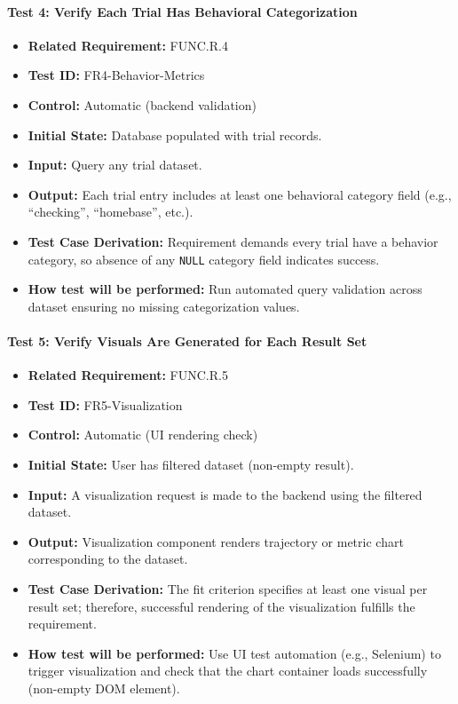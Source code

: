 \documentclass[12pt, titlepage]{article}
\begin{document}
\paragraph{Test 4: Verify Each Trial Has Behavioral Categorization}
\begin{itemize}
    \item \textbf{Related Requirement:} FUNC.R.4
    \item \textbf{Test ID:} FR4-Behavior-Metrics
    \item \textbf{Control:} Automatic (backend validation)
    \item \textbf{Initial State:} Database populated with trial records.
    \item \textbf{Input:} Query any trial dataset.
    \item \textbf{Output:} Each trial entry includes at least one behavioral category field (e.g., ``checking'', ``homebase'', etc.).
    \item \textbf{Test Case Derivation:} Requirement demands every trial have a behavior category, so absence of any \texttt{NULL} category field indicates success.
    \item \textbf{How test will be performed:} Run automated query validation across dataset ensuring no missing categorization values.
\end{itemize}

\paragraph{Test 5: Verify Visuals Are Generated for Each Result Set}
\begin{itemize}
    \item \textbf{Related Requirement:} FUNC.R.5
    \item \textbf{Test ID:} FR5-Visualization
    \item \textbf{Control:} Automatic (UI rendering check)
    \item \textbf{Initial State:} User has filtered dataset (non-empty result).
    \item \textbf{Input:} A visualization request is made to the backend using the filtered dataset.
    \item \textbf{Output:} Visualization component renders trajectory or metric chart corresponding to the dataset.
    \item \textbf{Test Case Derivation:} The fit criterion specifies at least one visual per result set; therefore, successful rendering of the visualization fulfills the requirement.
    \item \textbf{How test will be performed:} Use UI test automation (e.g., Selenium) to trigger visualization and check that the chart container loads successfully (non-empty DOM element).
\end{itemize}
\end{document}
